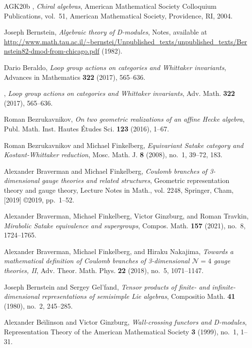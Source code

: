 \begin{thebibliography}{AGK{\etalchar{+}}20b}
\bysame, \emph{Chiral algebras}, American Mathematical Society Colloquium
  Publications, vol.~51, American Mathematical Society, Providence, RI, 2004.

Joseph Bernstein, \emph{Algebraic theory of {D}-modules}, Notes, available at
  \url{http://www.math.tau.ac.il/~bernstei/Unpublished_texts/unpublished_texts/Bernstein82-dmod-from-chicago.pdf}
  (1982).

Dario Beraldo, \emph{Loop group actions on categories and {W}hittaker
  invariants}, Advances in Mathematics \textbf{322} (2017), 565--636.

\bysame, \emph{Loop group actions on categories and {W}hittaker invariants},
  Adv. Math. \textbf{322} (2017), 565--636.

Roman Bezrukavnikov, \emph{On two geometric realizations of an affine {H}ecke
  algebra}, Publ. Math. Inst. Hautes \'{E}tudes Sci. \textbf{123} (2016),
  1--67.

Roman Bezrukavnikov and Michael Finkelberg, \emph{Equivariant {S}atake category
  and {K}ostant-{W}hittaker reduction}, Mosc. Math. J. \textbf{8} (2008),
  no.~1, 39--72, 183.

Alexander Braverman and Michael Finkelberg, \emph{Coulomb branches of
  3-dimensional gauge theories and related structures}, Geometric
  representation theory and gauge theory, Lecture Notes in Math., vol. 2248,
  Springer, Cham, [2019] \copyright 2019, pp.~1--52.

Alexander Braverman, Michael Finkelberg, Victor Ginzburg, and Roman Travkin,
  \emph{Mirabolic {S}atake equivalence and supergroups}, Compos. Math.
  \textbf{157} (2021), no.~8, 1724--1765.

Alexander Braverman, Michael Finkelberg, and Hiraku Nakajima, \emph{Towards a
  mathematical definition of {C}oulomb branches of 3-dimensional
  {$\mathcal{N}=4$} gauge theories, {II}}, Adv. Theor. Math. Phys. \textbf{22}
  (2018), no.~5, 1071--1147.

Joseph Bernstein and Sergey Gel'fand, \emph{Tensor products of finite- and
  infinite-dimensional representations of semisimple {L}ie algebras},
  Compositio Math. \textbf{41} (1980), no.~2, 245--285.

Alexander Be\u{\i}linson and Victor Ginzburg, \emph{Wall-crossing functors and
  {D}-modules}, Representation Theory of the American Mathematical Society
  \textbf{3} (1999), no.~1, 1--31.


\end{thebibliography}
